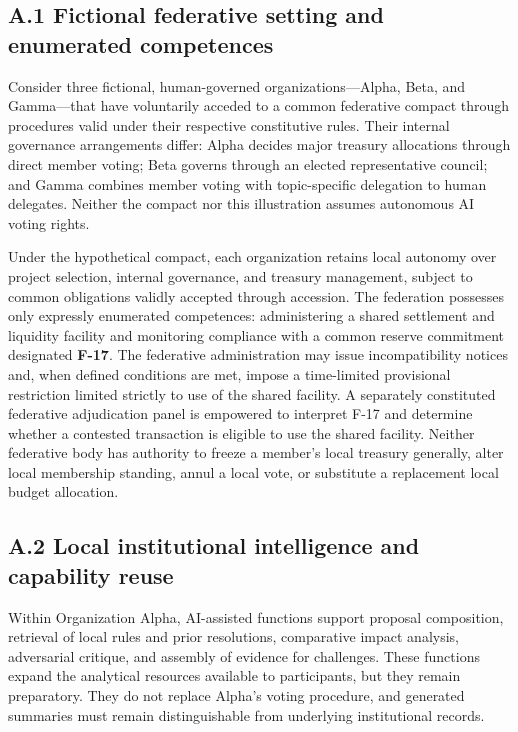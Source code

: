 \documentclass[
  10pt,
]{article}
\begin{document}
\subsection{A.1 Fictional federative setting and enumerated
competences}\label{a.1-fictional-federative-setting-and-enumerated-competences}

Consider three fictional, human-governed organizations---Alpha, Beta,
and Gamma---that have voluntarily acceded to a common federative compact
through procedures valid under their respective constitutive rules.
Their internal governance arrangements differ: Alpha decides major
treasury allocations through direct member voting; Beta governs through
an elected representative council; and Gamma combines member voting with
topic-specific delegation to human delegates. Neither the compact nor
this illustration assumes autonomous AI voting rights.

Under the hypothetical compact, each organization retains local autonomy
over project selection, internal governance, and treasury management,
subject to common obligations validly accepted through accession. The
federation possesses only expressly enumerated competences:
administering a shared settlement and liquidity facility and monitoring
compliance with a common reserve commitment designated \textbf{F-17}.
The federative administration may issue incompatibility notices and,
when defined conditions are met, impose a time-limited provisional
restriction limited strictly to use of the shared facility. A separately
constituted federative adjudication panel is empowered to interpret F-17
and determine whether a contested transaction is eligible to use the
shared facility. Neither federative body has authority to freeze a
member's local treasury generally, alter local membership standing,
annul a local vote, or substitute a replacement local budget allocation.

\subsection{A.2 Local institutional intelligence and capability
reuse}\label{a.2-local-institutional-intelligence-and-capability-reuse}

Within Organization Alpha, AI-assisted functions support proposal
composition, retrieval of local rules and prior resolutions, comparative
impact analysis, adversarial critique, and assembly of evidence for
challenges. These functions expand the analytical resources available to
participants, but they remain preparatory. They do not replace Alpha's
voting procedure, and generated summaries must remain distinguishable
from underlying institutional records.
\end{document}
